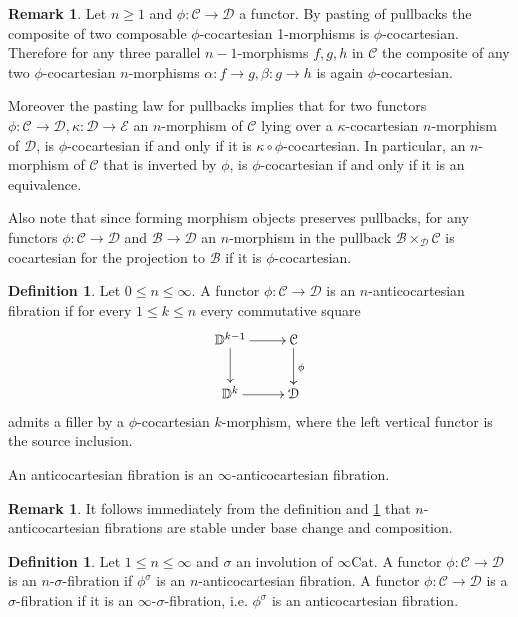 \documentclass[10pt,oneside]{article}
\numberwithin{equation}{section} %
\numberwithin{figure}{section} %
\theoremstyle{plain}
\theoremstyle{definition}
\newtheorem{definition}[theorem]{Definition}
\newtheorem{remark}[theorem]{Remark}
\newcommand{\bD}{{\mathbb D}}
\newcommand{\mB}{{\mathcal B}}
\newcommand{\mC}{{\mathcal C}}
\newcommand{\mD}{{\mathcal D}}
\newcommand{\mE}{{\mathcal E}}
\newcommand{\n}{{n}}
\newcommand{\Cat}{\mathrm{Cat}}
\begin{document}
\begin{remark}\label{elemen}
Let $n \geq 1$ and $\phi: \mC \to \mD$ a functor.
By pasting of pullbacks the composite of two composable $\phi$-cocartesian 1-morphisms is $\phi$-cocartesian.
Therefore for any three parallel $n-1$-morphisms $f,g,h$ in $\mC$
the composite of any two $\phi$-cocartesian $n$-morphisms $\alpha : f \to g, \beta: g \to h$ is again $\phi$-cocartesian.

Moreover the pasting law for pullbacks implies that for two functors
$\phi: \mC \to \mD, \kappa: \mD \to \mE$
an $n$-morphism of $\mC$ lying over a $\kappa$-cocartesian $n$-morphism of $\mD$, is $\phi$-cocartesian if and only if it is $\kappa \circ \phi$-cocartesian.
In particular, an $n$-morphism of $\mC$ that is inverted by $\phi$, is $\phi$-cocartesian if and only if it is an equivalence.

Also note that since forming morphism objects preserves pullbacks,
for any functors $\phi:\mC \to \mD$ and $\mB \to \mD$
an $n$-morphism in the pullback $\mB \times_\mD \mC $ is cocartesian for the projection to $\mB$ if it is $\phi$-cocartesian.
    
\end{remark}



\begin{definition} Let $0 \leq n \leq \infty.$
A functor $\phi: \mC \to \mD$ is an $n$-anticocartesian fibration if for every $1 \leq k \leq n$ 
every commutative square 
\begin{equation}\label{filler2}
\begin{xy}
\xymatrix{
\bD^{k-1} \ar[d] \ar[r]
& \mC \ar[d]^\phi
\\ 
\bD^k \ar[r] & \mD
}
\end{xy}\end{equation}
admits a filler by a $\phi$-cocartesian $k$-morphism,
where the left vertical functor is the source inclusion.

An anticocartesian fibration is an $\infty$-anticocartesian fibration.

\end{definition}

\begin{remark}
It follows immediately from the definition and \cref{elemen} that $n$-anticocartesian fibrations are stable under base change and composition.
\end{remark}

\begin{definition}Let $1 \leq n \leq \infty$ and $\sigma$ an involution of $\infty\Cat.$
A functor $\phi: \mC \to \mD$ is an $\n$-$\sigma$-fibration if $\phi^\sigma$ is an $n$-anticocartesian fibration.
A functor $\phi: \mC \to \mD$ is a $\sigma$-fibration if it is an $\infty$-$\sigma$-fibration, i.e. $\phi^\sigma$ is an anticocartesian fibration.

    
\end{definition}
\end{document}
